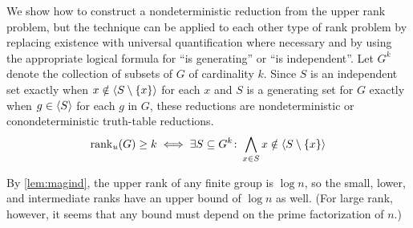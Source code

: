We show how to construct a nondeterministic reduction from the upper rank problem, but the technique can be applied to each other type of rank problem by replacing existence with universal quantification where necessary and by using the appropriate logical formula for ``is generating'' or ``is independent''.
Let $G^k$ denote the collection of subsets of $G$ of cardinality $k$.
Since $S$ is an independent set exactly when $x \notin \langle S \setminus \{x\} \rangle$ for each $x$ and $S$ is a generating set for $G$ exactly when $g \in \langle S \rangle$ for each $g$ in $G$, these reductions are nondeterministic or conondeterministic truth-table reductions.
$$
  \operatorname{rank}_u(G) \geq k \iff \exists S \subseteq G^k\colon \bigwedge_{x \in S} x \notin \langle S \setminus \{x\} \rangle
$$

By \autoref{lem:magind}, the upper rank of any finite group is $\log n$, so the small, lower, and intermediate ranks have an upper bound of $\log n$ as well.
(For large rank, however, it seems that any bound must depend on the prime factorization of $n$.)


